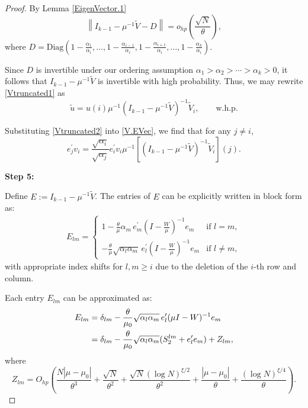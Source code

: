 \documentclass[10pt,a4paper]{amsart}
\begin{document}
\begin{proof}
By Lemma \ref{EigenVector.1}
\[
\left\| I_{k-1} - \mu^{-1}\tilde V - D \right\| = o_{hp}\left( \frac{\sqrt{N}}{\theta} \right),
\]
where $D = \mathrm{Diag}\left(1 - \frac{\alpha_1}{\alpha_i}, \ldots, 1 - \frac{\alpha_{i-1}}{\alpha_i}, 1 - \frac{\alpha_{i+1}}{\alpha_i}, \ldots, 1 - \frac{\alpha_k}{\alpha_i} \right)$.

Since $D$ is invertible under our ordering assumption $\alpha_1 > \alpha_2 > \cdots > \alpha_k > 0$, it follows that $I_{k-1} - \mu^{-1}\tilde V$ is invertible with high probability. Thus, we may rewrite \eqref{Vtruncated1} as
\begin{equation}\label{Vtruncated2}
\tilde u = u(i)\mu^{-1}\left(I_{k-1} - \mu^{-1} \tilde V\right)^{-1}\tilde V_i, \qquad \text{w.h.p.}
\end{equation}

Substituting \eqref{Vtruncated2} into \eqref{V.EVec}, we find that for any $j \ne i$,
\begin{equation}\label{EigenSp.dim1}
e_j^\prime v_i = \frac{\sqrt{\alpha_i}}{\sqrt{\alpha_j}} e_i^\prime v_i \mu^{-1} \left[ \left(I_{k-1} - \mu^{-1} \tilde V \right)^{-1} \tilde V_i \right](j).
\end{equation}

\textbf{Step 5:}

Define $E := I_{k-1} - \mu^{-1}\tilde V$. The entries of $E$ can be explicitly written in block form as:
\begin{align*}
E_{lm} = 
\begin{cases}
1 - \frac{\theta}{\mu} \alpha_m\, e_m^\prime\left(I - \frac{W}{\mu}\right)^{-1}e_m & \text{if } l = m, \\
- \frac{\theta}{\mu} \sqrt{\alpha_l \alpha_m}\, e_l^\prime\left(I - \frac{W}{\mu}\right)^{-1}e_m & \text{if } l \ne m,
\end{cases}
\end{align*}
with appropriate index shifts for $l,m \ge i$ due to the deletion of the $i$-th row and column.

Each entry $E_{lm}$ can be approximated as:
\begin{align}
E_{lm} 
&= \delta_{lm} - \frac{\theta}{\mu_0} \sqrt{\alpha_l \alpha_m}\, e_l^\prime (\mu I - W)^{-1} e_m \notag \\
&= \delta_{lm} - \frac{\theta}{\mu_0} \sqrt{\alpha_l \alpha_m}(S_2^{lm} + e_l^\prime e_m) + Z_{lm}, \label{Det.Approx1}
\end{align}
where
\[
Z_{lm} = O_{hp}\left( \frac{N|\mu - \mu_0|}{\theta^3} + \frac{\sqrt{N}}{\theta^2} + \frac{\sqrt{N}(\log N)^{\xi/2}}{\theta^2} + \frac{|\mu - \mu_0|}{\theta} + \frac{(\log N)^{\xi/4}}{\theta} \right).
\]


\end{proof}
\end{document}
